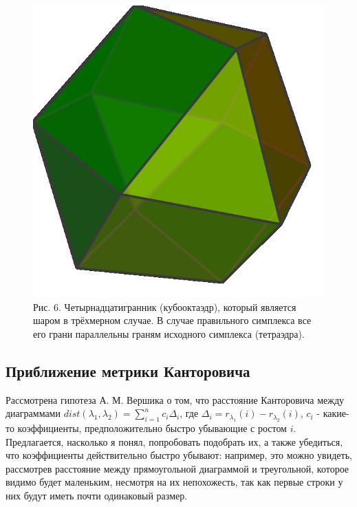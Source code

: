 \documentclass[12pt]{report}
\begin{document}
\begin{figure}[!ht]
\begin{center}
\includegraphics[scale=0.4]{14surf}
\\Рис. 6. Четырнадцатигранник (кубооктаэдр), который является шаром в трёхмерном случае. В случае правильного симплекса все его грани параллельны граням исходного симплекса (тетраэдра).
\end{center}
\end{figure}


\newpage
\subsection*{Приближение метрики Канторовича}
\hspace{\parindent} Рассмотрена гипотеза А. М. Вершика о том, что расстояние Канторовича между диаграммами $dist(\lambda_1, \lambda_2) = \sum\limits_{i = 1}^n c_i\Delta_i$, где $\Delta_i = r_{\lambda_1}(i) - r_{\lambda_2}(i)$, $c_i$ - какие-то коэффициенты, предположительно быстро убывающие с ростом $i$. Предлагается, насколько я понял, попробовать подобрать их, а также убедиться, что коэффициенты действительно быстро убывают:  например, это можно увидеть, рассмотрев расстояние между прямоугольной диаграммой и треугольной, которое видимо будет маленьким, несмотря на их непохожесть, так как первые строки у них будут иметь почти одинаковый размер. 
\end{document}
